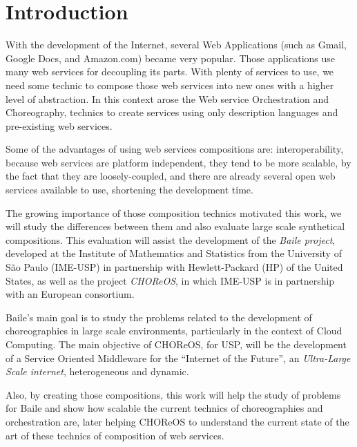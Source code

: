 \section{Introduction}

With the development of the Internet, several Web Applications (such as Gmail, Google Docs, and Amazon.com) became very popular. Those applications use many web services for decoupling its parts. With plenty of services to use, we need some technic to compose those web services into new ones with a higher level of abstraction. In this context arose the Web service Orchestration and Choreography, technics to create services using only description languages and pre-existing web services.

Some of the advantages of using web services compositions are: interoperability, because web services are platform independent, they tend to be more scalable, by the fact that they are loosely-coupled, and there are already several open web services available to use, shortening the development time.

The growing importance of those composition technics motivated this work, we will study the differences between them and also evaluate large scale synthetical compositions. This evaluation will assist the development of the \emph{Baile project}, developed at the Institute of Mathematics and Statistics from the University of São Paulo (IME-USP) in partnership with Hewlett-Packard (HP) of the United States, as well as the project \emph{CHOReOS}, in which IME-USP is in partnership with an European consortium.

Baile’s main goal is to study the problems related to the development of choreographies in large scale environments, particularly in the context of Cloud Computing. The main objective of CHOReOS, for USP, will be the development of a Service Oriented Middleware for the ``Internet of the Future'', an \emph{Ultra-Large Scale internet}, heterogeneous and dynamic.

Also, by creating those compositions, this work will help the study of problems for Baile and show how scalable the current technics of choreographies and orchestration are, later helping CHOReOS to understand the current state of the art of these technics of composition of web services.